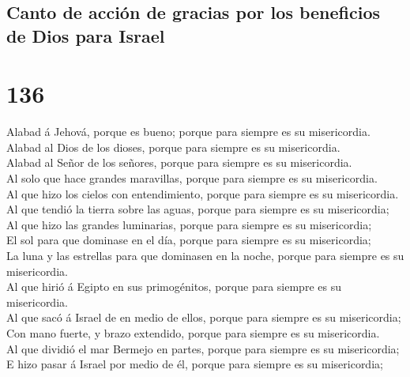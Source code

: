 \hypertarget{canto-de-acciuxf3n-de-gracias-por-los-beneficios-de-dios-para-israel}{%
\subsection{Canto de acción de gracias por los beneficios de Dios para
Israel}\label{canto-de-acciuxf3n-de-gracias-por-los-beneficios-de-dios-para-israel}}

\hypertarget{section-135}{%
\section{136}\label{section-135}}

 Alabad á Jehová, porque es bueno; porque para siempre es
su misericordia.\\
 Alabad al Dios de los dioses, porque para siempre es su
misericordia.\\
 Alabad al Señor de los señores, porque para siempre es su
misericordia.\\
 Al solo que hace grandes maravillas, porque para siempre
es su misericordia.\\
 Al que hizo los cielos con entendimiento, porque para
siempre es su misericordia.\\
 Al que tendió la tierra sobre las aguas, porque para
siempre es su misericordia;\\
 Al que hizo las grandes luminarias, porque para siempre
es su misericordia;\\
 El sol para que dominase en el día, porque para siempre
es su misericordia;\\
 La luna y las estrellas para que dominasen en la noche,
porque para siempre es su misericordia.\\
 Al que hirió á Egipto en sus primogénitos, porque para
siempre es su misericordia.\\
 Al que sacó á Israel de en medio de ellos, porque para
siempre es su misericordia;\\
 Con mano fuerte, y brazo extendido, porque para siempre
es su misericordia.\\
 Al que dividió el mar Bermejo en partes, porque para
siempre es su misericordia;\\
 E hizo pasar á Israel por medio de él, porque para
siempre es su misericordia;\\
